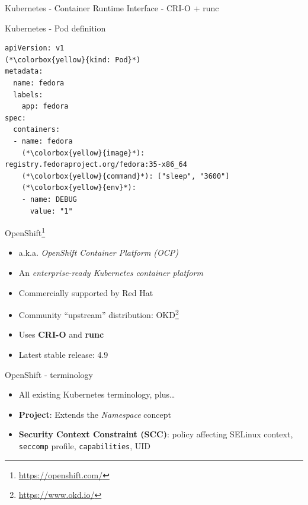 \documentclass[ignorenonframetext,aspectratio=169,12pt]{beamer}
\def\svgwidth{4cm}
\begin{document}
\begin{frame}{Kubernetes - Container Runtime Interface - CRI-O + runc}
\begin{center}
\def\svgwidth{\textwidth}

\end{center}
\end{frame}

\begin{frame}[fragile]{Kubernetes - Pod definition}
\protect\hypertarget{kubernetes-pod-spec}{}
\begin{lstlisting}
apiVersion: v1
(*\colorbox{yellow}{kind: Pod}*)
metadata:
  name: fedora
  labels:
    app: fedora
spec:
  containers:
  - name: fedora
    (*\colorbox{yellow}{image}*): registry.fedoraproject.org/fedora:35-x86_64
    (*\colorbox{yellow}{command}*): ["sleep", "3600"]
    (*\colorbox{yellow}{env}*):
    - name: DEBUG
      value: "1"
\end{lstlisting}
\end{frame}

\begin{frame}{OpenShift\footnote{\url{https://openshift.com/}}}
\protect\hypertarget{openshift-intro}{}

\begin{itemize}
\item a.k.a. {\em OpenShift Container Platform (OCP)}
\item An {\em enterprise-ready Kubernetes container platform}
\item Commercially supported by Red Hat
\item Community ``upstream'' distribution: OKD\footnote{\url{https://www.okd.io/}}
\item Uses {\bf CRI-O} and {\bf runc}
\item Latest stable release: 4.9
\end{itemize}

\end{frame}

\begin{frame}{OpenShift - terminology}
\protect\hypertarget{openshift-terminology}{}

\begin{itemize}

\item All existing Kubernetes terminology, plus\ldots{}

\item {\bf Project}: Extends the {\em Namespace} concept

\item {\bf Security Context Constraint (SCC)}: policy affecting
    SELinux context, {\tt seccomp} profile, {\tt capabilities}, UID

\end{itemize}

\end{frame}
\end{document}
